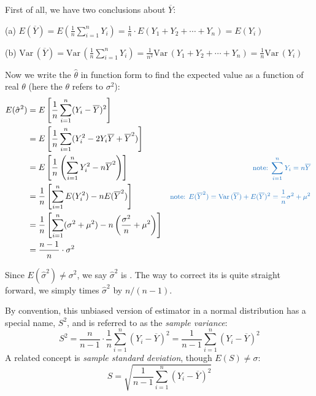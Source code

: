 \documentclass[11pt]{article}
\def\Var{{\textrm{Var}}\,}
\begin{document}
First of all,  we have two conclusions about $ \overline{Y} $:

(a) $\displaystyle E( \overline{Y} )= E \left( \frac{1}{n} \sum _{i=1} ^n Y_i \right) = \frac{1}{n} \cdot E(Y_1 + Y_2 + \cdots + Y_n) = E(Y_i) $

(b) $\displaystyle \Var ( \overline{Y} ) = \Var \left( \frac{1}{n} \sum _{i=1} ^n Y_i \right) = \frac{1}{n^2} \Var (Y_1 + Y_2 + \cdots + Y_n) = \frac{1}{n} \Var(Y_i) $

\vspace{5pt}

Now we write the $\hat{\theta}$ in function form to find the expected value as a function of real $\theta$ (here the $\theta$ refers to $\sigma^2$):
\[
\begin{aligned}
E(\hat{\sigma}^2)
&= E \left[  \frac{1}{n} \sum _{i=1} ^n (Y_i - \overline{Y} )^2  \right] \\
&= E \left[  \frac{1}{n} \sum _{i=1} ^n (Y_i ^2 - 2Y_i \overline{Y} + \overline{Y} ^2)  \right] \\
&= E \left[  \frac{1}{n} \left( \sum _{i=1} ^n Y_i ^2 - n \overline{Y}^2 \right)  \right] & \text{\color{RoyalBlue} \footnotesize note: $\sum _{i=1} ^n Y_i = n \overline{Y} $ } \\
&= \frac{1}{n} \left[ \sum _{i=1} ^n E(Y_i ^2) - n E(\overline{Y}^2) \right] & \text{\color{RoyalBlue} \footnotesize note: $E(\overline{Y}^2) = \Var(\overline{Y}) + E(\overline{Y})^2  = \frac{1}{n} \sigma^2 + \mu^2 $ } \\
&= \frac{1}{n} \left[ \sum _{i=1} ^n (\sigma^2 + \mu^2) - n \left( \frac{\sigma^2}{n} + \mu^2 \right) \right] \\
&= \frac{n-1}{n} \cdot \sigma^2 \\
\end{aligned}
\]

Since $E(\hat{\sigma}^2) \neq \sigma^2$,  we say $\hat{\sigma}^2$ is .  The way to correct its  is quite straight forward,  we simply times  $\hat{\sigma}^2$ by $n/(n-1)$. 

By convention,  this unbiased version of estimator in a normal distribution has a special name, $S^2$,  and is referred to as the \textit{sample variance}: 
\[ S^2 = \frac{n}{n-1} \cdot \frac{1}{n}  \sum _{i=1} ^n (Y_i - \overline{Y} )^2 = \frac{1}{n-1} \sum _{i=1} ^n (Y_i - \overline{Y} )^2  \]
A related concept is \textit{sample standard deviation},  though $E(S) \neq \sigma$: 
\[ S = \sqrt{\frac{1}{n-1} \sum _{i=1} ^n (Y_i - \overline{Y} )^2 } \]
\end{document}
